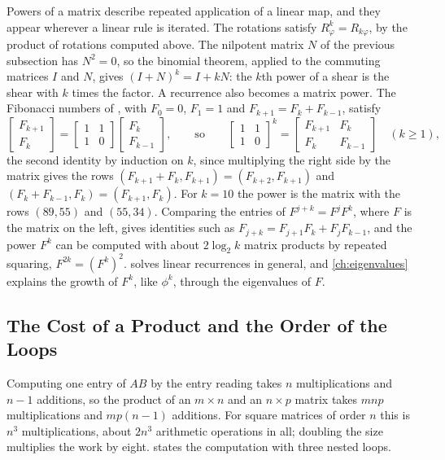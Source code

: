 Powers of a matrix describe repeated application of a linear map, and they appear wherever a linear rule is iterated. The rotations satisfy $R_\varphi^k=R_{k\varphi}$, by the product of rotations computed above. The nilpotent matrix $N$ of the previous subsection has $N^2=0$, so the binomial theorem, applied to the commuting matrices $I$ and $N$, gives $(I+N)^k=I+kN$: the $k$th power of a shear is the shear with $k$ times the factor. A recurrence also becomes a matrix power. The Fibonacci numbers of , with $F_0=0$, $F_1=1$ and $F_{k+1}=F_k+F_{k-1}$, satisfy
\[
\begin{bmatrix}F_{k+1}\\F_k\end{bmatrix}=\begin{bmatrix}1&1\\1&0\end{bmatrix}\begin{bmatrix}F_k\\F_{k-1}\end{bmatrix},\qquad\text{so}\qquad\begin{bmatrix}1&1\\1&0\end{bmatrix}^k=\begin{bmatrix}F_{k+1}&F_k\\F_k&F_{k-1}\end{bmatrix}\quad(k\ge1),
\]
the second identity by induction on $k$, since multiplying the right side by the matrix gives the rows $(F_{k+1}+F_k,F_{k+1})=(F_{k+2},F_{k+1})$ and $(F_k+F_{k-1},F_k)=(F_{k+1},F_k)$. For $k=10$ the power is the matrix with the rows $(89,55)$ and $(55,34)$. Comparing the entries of $F^{j+k}=F^jF^k$, where $F$ is the matrix on the left, gives identities such as $F_{j+k}=F_{j+1}F_k+F_jF_{k-1}$, and the power $F^k$ can be computed with about $2\log_2k$ matrix products by repeated squaring, $F^{2k}=(F^k)^2$.  solves linear recurrences in general, and \cref{ch:eigenvalues} explains the growth of $F^k$, like $\phi^k$, through the eigenvalues of $F$.

\subsection{The Cost of a Product and the Order of the Loops}

Computing one entry of $AB$ by the entry reading takes $n$ multiplications and $n-1$ additions, so the product of an $m\times n$ and an $n\times p$ matrix takes $mnp$ multiplications and $mp(n-1)$ additions. For square matrices of order $n$ this is $n^3$ multiplications, about $2n^3$ arithmetic operations in all; doubling the size multiplies the work by eight.  states the computation with three nested loops.

